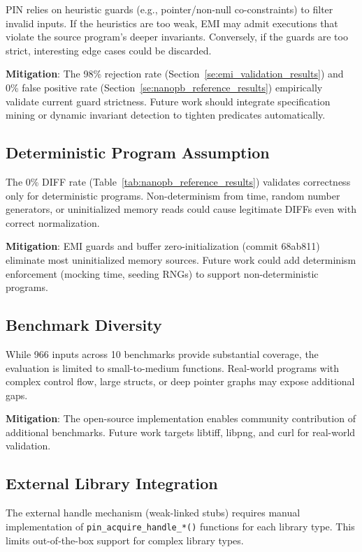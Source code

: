 \documentclass[doublespace,nopageskip]{VTthesis}
\begin{document}
PIN relies on heuristic guards (e.g., pointer/non-null co-constraints) to filter invalid inputs. If the heuristics are too weak, EMI may admit executions that violate the source program's deeper invariants. Conversely, if the guards are too strict, interesting edge cases could be discarded.

\textbf{Mitigation}: The 98\% rejection rate (Section~\ref{se:emi_validation_results}) and 0\% false positive rate (Section~\ref{se:nanopb_reference_results}) empirically validate current guard strictness. Future work should integrate specification mining or dynamic invariant detection to tighten predicates automatically.

\subsection{Deterministic Program Assumption}

The 0\% DIFF rate (Table~\ref{tab:nanopb_reference_results}) validates correctness only for deterministic programs. Non-determinism from time, random number generators, or uninitialized memory reads could cause legitimate DIFFs even with correct normalization.

\textbf{Mitigation}: EMI guards and buffer zero-initialization (commit 68ab811) eliminate most uninitialized memory sources. Future work could add determinism enforcement (mocking time, seeding RNGs) to support non-deterministic programs.

\subsection{Benchmark Diversity}

While 966 inputs across 10 benchmarks provide substantial coverage, the evaluation is limited to small-to-medium functions. Real-world programs with complex control flow, large structs, or deep pointer graphs may expose additional gaps.

\textbf{Mitigation}: The open-source implementation enables community contribution of additional benchmarks. Future work targets libtiff, libpng, and curl for real-world validation.

\subsection{External Library Integration}

The external handle mechanism (weak-linked stubs) requires manual implementation of \texttt{pin\_acquire\_handle\_*()} functions for each library type. This limits out-of-the-box support for complex library types.
\end{document}
